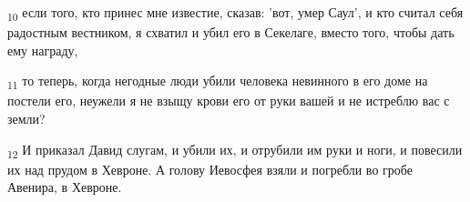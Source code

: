 \begin{tcolorbox}
\textsubscript{10} если того, кто принес мне известие, сказав: 'вот, умер Саул', и кто считал себя радостным вестником, я схватил и убил его в Секелаге, вместо того, чтобы дать ему награду,
\end{tcolorbox}
\begin{tcolorbox}
\textsubscript{11} то теперь, когда негодные люди убили человека невинного в его доме на постели его, неужели я не взыщу крови его от руки вашей и не истреблю вас с земли?
\end{tcolorbox}
\begin{tcolorbox}
\textsubscript{12} И приказал Давид слугам, и убили их, и отрубили им руки и ноги, и повесили их над прудом в Хевроне. А голову Иевосфея взяли и погребли во гробе Авенира, в Хевроне.
\end{tcolorbox}
